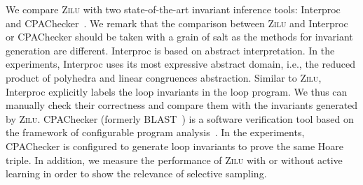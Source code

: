 We compare \textsc{Zilu} with two state-of-the-art invariant inference tools: Interproc~\cite{jeannet2010interproc} and CPAChecker~\cite{beyer2011cpachecker}. %
We remark that the comparison between \textsc{Zilu} and Interproc or CPAChecker should be taken with a grain of salt as the methods for invariant generation are  different. Interproc is based on abstract interpretation. In the experiments, Interproc uses its most expressive abstract domain, i.e., the reduced product of polyhedra and linear congruences abstraction. Similar to \textsc{Zilu}, Interproc explicitly labels the loop invariants in the loop program. We thus can manually check their correctness and compare them with the invariants generated by \textsc{Zilu}. CPAChecker (formerly BLAST~\cite{henzinger2003software}) is a software verification tool based on the framework of configurable program analysis~\cite{beyer2007configurable}. In the experiments, CPAChecker is configured to generate loop invariants to prove the same Hoare triple. In addition, we measure the performance of \textsc{Zilu} with or without active learning in order to show the relevance of selective sampling.


